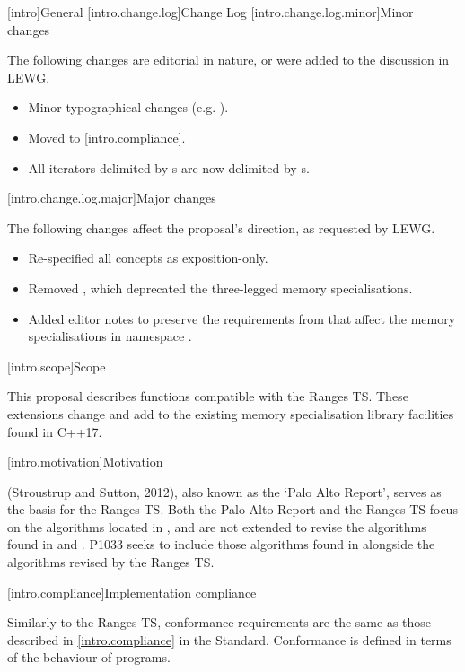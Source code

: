 [intro]{General}
[intro.change.log]{Change Log}
[intro.change.log.minor]{Minor changes}

The following changes are editorial in nature, or were added to the discussion
in LEWG.

\begin{itemize}
\item Minor typographical changes (e.g. ).
\item Moved  to \ref{intro.compliance}.
\item All  iterators delimited by s are now delimited by
      s.
\end{itemize}

[intro.change.log.major]{Major changes}

The following changes affect the proposal's direction, as requested by LEWG.

\begin{itemize}
\item Re-specified all concepts as exposition-only.
\item Removed , which deprecated the three-legged memory
      specialisations.
\item Added editor notes to preserve the requirements from  that affect the
      memory specialisations in namespace .
\end{itemize}

[intro.scope]{Scope}

\pnum
This proposal describes functions compatible with the Ranges TS. These extensions change and add to
the existing memory specialisation library facilities found in C++17.

[intro.motivation]{Motivation}

\pnum
{} (Stroustrup and Sutton, 2012), also known as the
`Palo Alto Report', serves as the basis for the Ranges TS. Both the Palo Alto Report and the Ranges
TS focus on the algorithms located in , and are not extended to revise the
algorithms found in  and . P1033 seeks to include those algorithms
found in  alongside the algorithms revised by the Ranges TS.

[intro.compliance]{Implementation compliance}

\pnum
Similarly to the Ranges TS, conformance requirements are the same as those described in
\ref{intro.compliance} in the \Cpp Standard.
\enternote
Conformance is defined in terms of the behaviour of programs.
\exitnote

